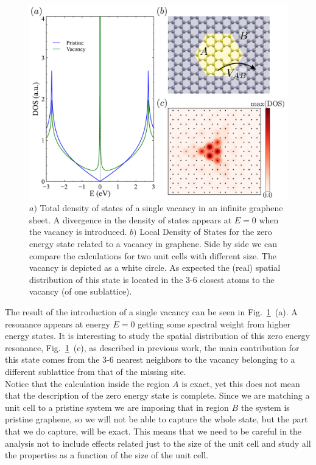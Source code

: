 \begin{figure}[h!]
\centering
\includegraphics{chapter05/figures/DOSlDOS.pdf}
\vspace{-5pt}
\caption{$a)$ Total density of states of a single vacancy in an infinite graphene sheet. A divergence in the density of states appears at $E=0$ when the vacancy is introduced. $b)$ Local Density of States for the zero energy state related to a vacancy in graphene. Side by side we can compare the calculations for two unit cells with different size. The vacancy is depicted as a white circle. As expected the (real) spatial distribution of this state is located in the 3-6 closest atoms to the vacancy (of one sublattice).}
\label{DOS}
\vspace{-5pt}
\end{figure}

The result of the introduction of a single vacancy can be seen in Fig.~\ref{DOS}~(a). A resonance appears at energy $E=0$ getting some spectral weight from higher energy states.
It is interesting to study the spatial distribution of this zero energy resonance, Fig.~\ref{DOS}~(c), as described in previous work, the main contribution for this state comes from the 3-6 nearest neighbors to the vacancy belonging to a different sublattice from that of the missing site.\\

Notice that the calculation inside the region $A$ is exact, yet this does not mean that the description of the zero energy state is complete. Since we are matching a unit cell to a pristine system we are imposing that in region $B$ the system is pristine graphene, so we will not be able to capture the whole state, but the part that we do capture, will be exact.
This means that we need to be careful in the analysis not to include effects related just to the size of the unit cell and study all the properties as a function of the size of the unit cell.




